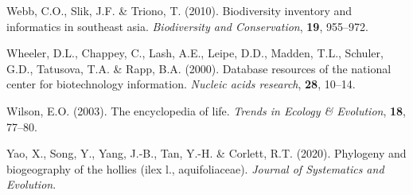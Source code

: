 \documentclass[]{article}
\begin{document}
\leavevmode\hypertarget{ref-webb2010biodiversity}{}%
Webb, C.O., Slik, J.F. \& Triono, T. (2010). Biodiversity inventory and informatics in southeast asia. \emph{Biodiversity and Conservation}, \textbf{19}, 955--972.

\leavevmode\hypertarget{ref-wheeler2000database}{}%
Wheeler, D.L., Chappey, C., Lash, A.E., Leipe, D.D., Madden, T.L., Schuler, G.D., Tatusova, T.A. \& Rapp, B.A. (2000). Database resources of the national center for biotechnology information. \emph{Nucleic acids research}, \textbf{28}, 10--14.

\leavevmode\hypertarget{ref-wilson2003encyclopedia}{}%
Wilson, E.O. (2003). The encyclopedia of life. \emph{Trends in Ecology \& Evolution}, \textbf{18}, 77--80.

\leavevmode\hypertarget{ref-yao2020phylogeny}{}%
Yao, X., Song, Y., Yang, J.-B., Tan, Y.-H. \& Corlett, R.T. (2020). Phylogeny and biogeography of the hollies (ilex l., aquifoliaceae). \emph{Journal of Systematics and Evolution}.
\end{document}
